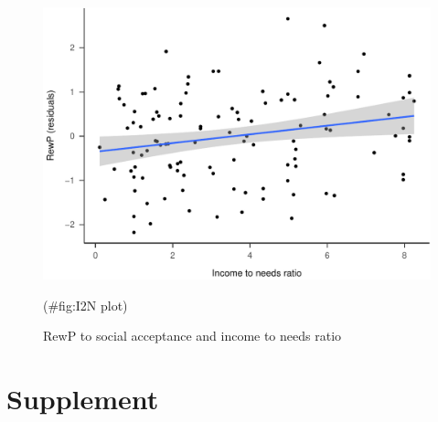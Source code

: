 \documentclass[english,man,floatsintext]{apa6}
\begin{document}
\begin{figure}

{\centering \includegraphics[width=1\linewidth]{DISS_tablesfigures_files/figure-latex/I2N plot-1} 

}

\caption{RewP to social acceptance and income to needs ratio}(\#fig:I2N plot)
\end{figure}

\newpage

\hypertarget{supplement}{%
\section{Supplement}\label{supplement}}
\end{document}
